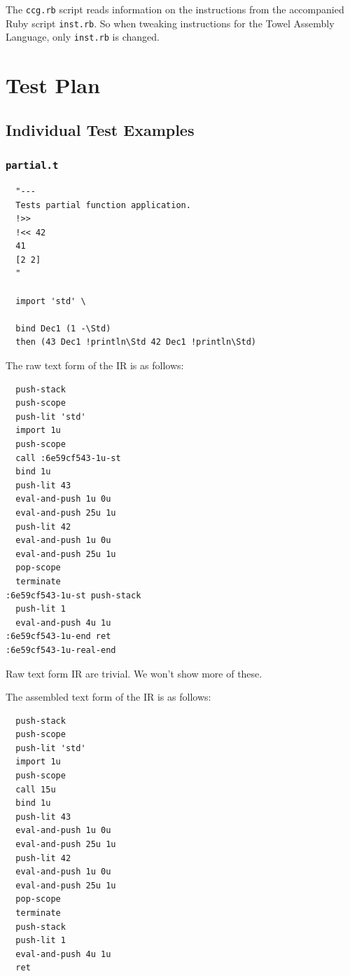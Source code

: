 \documentclass{report}
\begin{document}
\begin{mdframed}[style=detail]
  The \texttt{ccg.rb} script reads information on the instructions from the accompanied Ruby script \texttt{inst.rb}. So when tweaking instructions for the Towel Assembly Language, only \texttt{inst.rb} is changed.
\end{mdframed}

\chapter{Test Plan}

\section{Individual Test Examples}

\subsection{\texttt{partial.t}}
\begin{mdframed}[style=cl]
\begin{verbatim}
  "---
  Tests partial function application.
  !>>
  !<< 42
  41
  [2 2]
  "

  import 'std' \

  bind Dec1 (1 -\Std)
  then (43 Dec1 !println\Std 42 Dec1 !println\Std)
\end{verbatim}
\end{mdframed}

The raw text form of the IR is as follows:

\begin{mdframed}[style=cl]
\begin{verbatim}
  push-stack
  push-scope
  push-lit 'std'
  import 1u
  push-scope
  call :6e59cf543-1u-st
  bind 1u
  push-lit 43
  eval-and-push 1u 0u
  eval-and-push 25u 1u
  push-lit 42
  eval-and-push 1u 0u
  eval-and-push 25u 1u
  pop-scope
  terminate
:6e59cf543-1u-st push-stack
  push-lit 1
  eval-and-push 4u 1u
:6e59cf543-1u-end ret
:6e59cf543-1u-real-end
\end{verbatim}

Raw text form IR are trivial. We won't show more of these.
\end{mdframed}

The assembled text form of the IR is as follows:

\begin{mdframed}[style=cl]
\begin{verbatim}
  push-stack
  push-scope
  push-lit 'std'
  import 1u
  push-scope
  call 15u
  bind 1u
  push-lit 43
  eval-and-push 1u 0u
  eval-and-push 25u 1u
  push-lit 42
  eval-and-push 1u 0u
  eval-and-push 25u 1u
  pop-scope
  terminate
  push-stack
  push-lit 1
  eval-and-push 4u 1u
  ret
\end{verbatim}
\end{mdframed}
\end{document}
